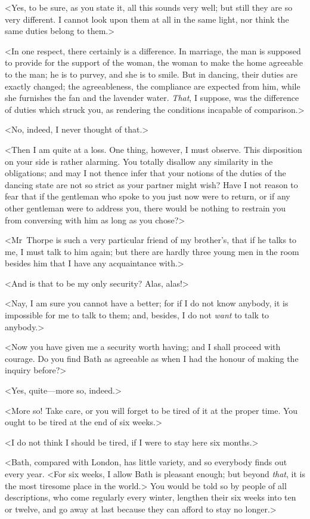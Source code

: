  <Yes, to be sure, as you state it, all this sounds very well; but still they are so very different. I cannot look upon them at all in the same light, nor think the same duties belong to them.> 

 <In one respect, there certainly is a difference. In marriage, the man is supposed to provide for the support of the woman, the woman to make the home agreeable to the man; he is to purvey, and she is to smile. But in dancing, their duties are exactly changed; the agreeableness, the compliance are expected from him, while she furnishes the fan and the lavender water. \textit{That}, I suppose, was the difference of duties which struck you, as rendering the conditions incapable of comparison.> 

 <No, indeed, I never thought of that.> 

 <Then I am quite at a loss. One thing, however, I must observe. This disposition on your side is rather alarming. You totally disallow any similarity in the obligations; and may I not thence infer that your notions of the duties of the dancing state are not so strict as your partner might wish? Have I not reason to fear that if the gentleman who spoke to you just now were to return, or if any other gentleman were to address you, there would be nothing to restrain you from conversing with him as long as you chose?> 

 <Mr~Thorpe is such a very particular friend of my brother's, that if he talks to me, I must talk to him again; but there are hardly three young men in the room besides him that I have any acquaintance with.> 

 <And is that to be my only security? Alas, alas!> 

 <Nay, I am sure you cannot have a better; for if I do not know anybody, it is impossible for me to talk to them; and, besides, I do not \textit{want} to talk to anybody.> 

 <Now you have given me a security worth having; and I shall proceed with courage. Do you find Bath as agreeable as when I had the honour of making the inquiry before?> 

 <Yes, quite—more so, indeed.> 

 <More so! Take care, or you will forget to be tired of it at the proper time. You ought to be tired at the end of six weeks.> 

 <I do not think I should be tired, if I were to stay here six months.> 

 <Bath, compared with London, has little variety, and so everybody finds out every year. <For six weeks, I allow Bath is pleasant enough; but beyond \textit{that}, it is the most tiresome place in the world.> You would be told so by people of all descriptions, who come regularly every winter, lengthen their six weeks into ten or twelve, and go away at last because they can afford to stay no longer.> 

